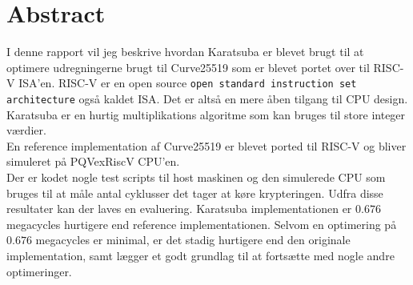 \section{Abstract}
I denne rapport vil jeg beskrive hvordan Karatsuba er blevet brugt til at optimere udregningerne brugt til Curve25519 som er blevet portet over til RISC-V ISA'en. RISC-V er en open source \texttt{open standard instruction set architecture} også kaldet ISA. Det er altså en mere åben tilgang til CPU design.
\\
Karatsuba er en hurtig multiplikations algoritme som kan bruges til store integer værdier.\\En reference implementation af Curve25519 er blevet ported til RISC-V og bliver simuleret på PQVexRiscV CPU'en.\\Der er kodet nogle test scripts til host maskinen og den simulerede CPU som bruges til at måle antal cyklusser det tager at køre krypteringen.  
Udfra disse resultater kan der laves en evaluering. Karatsuba implementationen er $0.676$ megacycles hurtigere end reference implementationen. Selvom en optimering på $0.676$ megacycles er minimal, er det stadig hurtigere end den originale implementation, samt lægger et godt grundlag til at fortsætte med nogle andre optimeringer.